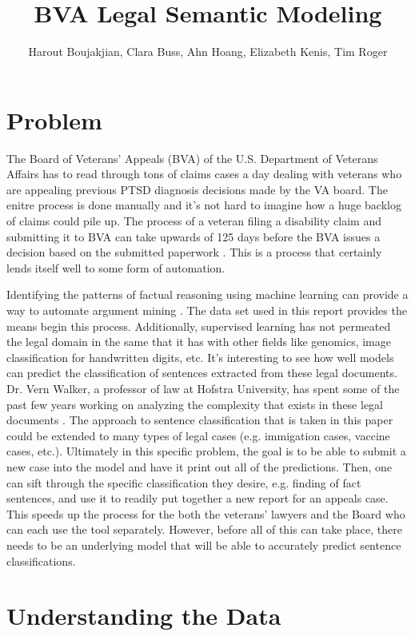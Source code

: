 \documentclass[11pt]{article}
\title{BVA Legal Semantic Modeling}
\author{Harout Boujakjian, Clara Buss, Ahn Hoang, Elizabeth Kenis, Tim Roger}
\begin{document}
\maketitle

\section*{Problem}

The Board of Veterans' Appeals (BVA) of the U.S. Department of Veterans Affairs has to read through tons of claims cases a day dealing with veterans who are appealing previous PTSD diagnosis decisions made by the VA board. The enitre process is done manually and it's not hard to imagine how a huge backlog of claims could pile up. The process of a veteran filing a disability claim and submitting it to BVA can take upwards of 125 days before the BVA issues a decision based on the submitted paperwork \cite{BVAaudit}. This is a process that certainly lends itself well to some form of automation. 

Identifying the patterns of factual reasoning using machine learning can provide a way to automate argument mining \cite{Walker2019AutomaticCO}. The data set used in this report provides the means begin this process. Additionally, supervised learning has not permeated the legal domain in the same that it has with other fields like genomics, image classification for handwritten digits, etc. It's interesting to see how well models can predict the classification of sentences extracted from these legal documents. Dr. Vern Walker, a professor of law at Hofstra University, has spent some of the past few years working on analyzing the complexity that exists in these legal documents \cite{Walker2017Semantic}. The approach to sentence classification that is taken in this paper could be extended to many types of legal cases (e.g. immigation cases, vaccine cases, etc.). Ultimately in this specific problem, the goal is to be able to submit a new case into the model and have it print out all of the predictions. Then, one can sift through the specific classification they desire, e.g. finding of fact sentences, and use it to readily put together a new report for an appeals case. This speeds up the process for the both the veterans' lawyers and the Board who can each use the tool separately. However, before all of this can take place, there needs to be an underlying model that will be able to accurately predict sentence classifications.

\section*{Understanding the Data}
\end{document}
